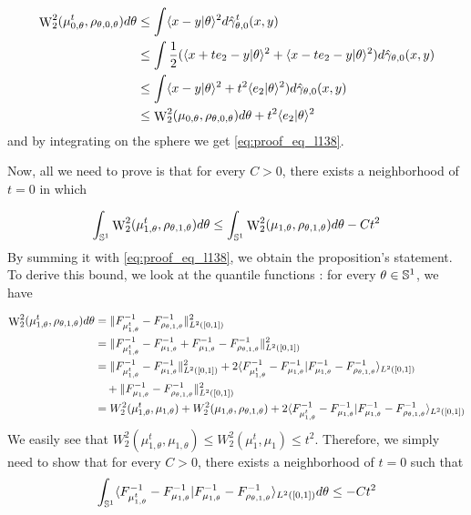     \begin{align}
        \mathop{\mathrm{W}}\nolimits^2_2(\mu^t_{0,\theta},\rho_{\theta,0,\theta})d\theta 
        &\leq \int \langle x-y|\theta\rangle^2 d\hat{\gamma}_{\theta,0}^t(x,y) \\
        &\leq \int \frac{1}{2}(\langle x+te_2-y|\theta\rangle^2 + \langle x-te_2-y|\theta\rangle^2) d\hat{\gamma}_{\theta,0}(x,y) \\
        &\leq \int \langle x-y|\theta\rangle^2 + t^2\langle e_2|\theta\rangle^2) d\hat{\gamma}_{\theta,0}(x,y) \\
        &\leq \mathop{\mathrm{W}}\nolimits^2_2(\mu_{0,\theta},\rho_{\theta,0,\theta})d\theta + t^2\langle e_2|\theta\rangle^2
    \end{align}
    and by integrating on the sphere we get \eqref{eq:proof_eq_l138}.

    Now, all we need to prove is that for every $C > 0$, there exists a neighborhood of $t = 0$ in which

    \begin{equation} \int_{\mathbb S^1} \mathop{\mathrm{W}}\nolimits^2_2(\mu^t_{1,\theta},\rho_{\theta,1,\theta})d\theta \leq \int_{\mathbb S^1} \mathop{\mathrm{W}}\nolimits^2_2(\mu_{1,\theta},\rho_{\theta,1,\theta})d\theta - C t^2 \end{equation}
    By summing it with \eqref{eq:proof_eq_l138}, we obtain the proposition's statement. To derive this bound, we look at the quantile functions : for every $\theta \in \mathbb S^1$, we have

    \begin{align}
        \mathop{\mathrm{W}}\nolimits^2_2(\mu^t_{1,\theta},\rho_{\theta,1,\theta})d\theta 
        &= \|F^{-1}_{\mu^t_{1,\theta}} - F^{-1}_{\rho_{\theta,1,\theta}}\|^2_{L^2([0,1])} \\
        &= \|F^{-1}_{\mu^t_{1,\theta}} - F^{-1}_{\mu_{1,\theta}} + F^{-1}_{\mu_{1,\theta}} - F^{-1}_{\rho_{\theta,1,\theta}}\|^2_{L^2([0,1])} \\
        &= \|F^{-1}_{\mu^t_{1,\theta}} - F^{-1}_{\mu_{1,\theta}}\|^2_{L^2([0,1])} + 2\langle F^{-1}_{\mu^t_{1,\theta}} - F^{-1}_{\mu_{1,\theta}}|F^{-1}_{\mu_{1,\theta}} - F^{-1}_{\rho_{\theta,1,\theta}}\rangle_{L^2([0,1])} \\
        &\quad + \| F^{-1}_{\mu_{1,\theta}} - F^{-1}_{\rho_{\theta,1,\theta}}\|^2_{L^2([0,1])} \\
        &= W^2_2(\mu^t_{1,\theta},\mu_{1,\theta}) + W^2_2(\mu_{1,\theta},\rho_{\theta,1,\theta}) + 2\langle F^{-1}_{\mu^t_{1,\theta}} - F^{-1}_{\mu_{1,\theta}}|F^{-1}_{\mu_{1,\theta}} - F^{-1}_{\rho_{\theta,1,\theta}}\rangle_{L^2([0,1])}
    \end{align}
    We easily see that $W^2_2(\mu^t_{1,\theta},\mu_{1,\theta}) \leq W_2^2(\mu^t_1,\mu_1) \leq t^2$. Therefore, we simply need to show that for every $C > 0$, there exists a neighborhood of $t = 0$ such that 
    \begin{equation}
        \label{eq:proof_l169}
        \int_{\mathbb S^1}\langle F^{-1}_{\mu^t_{1,\theta}} - F^{-1}_{\mu_{1,\theta}}|F^{-1}_{\mu_{1,\theta}} - F^{-1}_{\rho_{\theta,1,\theta}}\rangle_{L^2([0,1])}d\theta \leq -Ct^2
    \end{equation}

